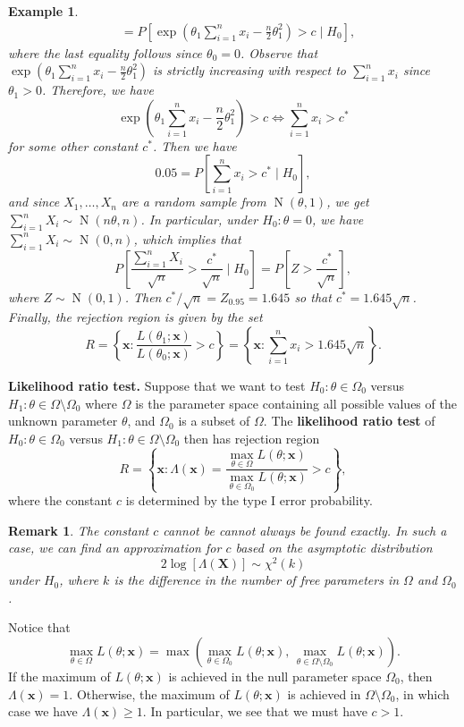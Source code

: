 \documentclass[10pt]{article}
\DeclareMathOperator{\Nor}{N}
\theoremstyle{newstyle}
\newtheorem{remark}[thm]{Remark}
\newtheorem{exmp}[thm]{Example}
\begin{document}
\begin{exmp}
{\begin{align*}
    &= P \left[ \exp \left(\theta_1 \sum_{i=1}^n x_i - \frac{n}2 \theta_1^2 \right) > c 
    \;\Bigg|\; H_0 \right],
\end{align*}
where the last equality follows since $\theta_0 = 0$. 
Observe that $\exp(\theta_1 \sum_{i=1}^n x_i - \frac{n}2 \theta_1^2)$ is strictly increasing 
with respect to $\sum_{i=1}^n x_i$ since $\theta_1 > 0$. Therefore, we have 
\[ \exp \left(\theta_1 \sum_{i=1}^n x_i - \frac{n}2 \theta_1^2 \right) > c \iff \sum_{i=1}^n x_i > c^* 
\] 
for some other constant $c^*$. Then we have 
\[ 0.05 = P \left[ \sum_{i=1}^n x_i > c^* \;\Bigg|\; H_0 \right], \]
and since $X_1, \dots, X_n$ are a random sample from $\Nor(\theta, 1)$, we get 
$\sum_{i=1}^n X_i \sim \Nor(n\theta, n)$. In particular, under $H_0 : \theta = 0$, 
we have $\sum_{i=1}^n X_i \sim \Nor(0, n)$, which implies that 
\[ P \left[ \frac{\sum_{i=1}^n X_i}{\sqrt n} > \frac{c^*}{\sqrt n} \;\Bigg|\; H_0 \right] 
= P \left[ Z > \frac{c^*}{\sqrt n} \right], \]
where $Z \sim \Nor(0, 1)$. Then $c^*/\sqrt n = Z_{0.95} = 1.645$ so that 
$c^* = 1.645 \sqrt n$. Finally, the rejection region is given by the set 
\[ R = \left\{ \mathbf x : \frac{L(\theta_1; \mathbf x)}{L(\theta_0; \mathbf x)} > c \right\}
= \left\{ \mathbf x : \sum_{i=1}^n x_i > 1.645 \sqrt n \right\}. \]}
\end{exmp}

{\bf Likelihood ratio test.} Suppose that we want to test 
$H_0 : \theta \in \Omega_0$ versus $H_1 : \theta \in \Omega \setminus \Omega_0$ where 
$\Omega$ is the parameter space containing all possible values of the unknown parameter $\theta$, 
and $\Omega_0$ is a subset of $\Omega$. The 
{\bf likelihood ratio test} of $H_0 : \theta \in \Omega_0$ versus $H_1 : \theta \in \Omega \setminus
\Omega_0$ then has rejection region 
\[ R = \left\{ \mathbf x : \Lambda(\mathbf x) = \frac{\max_{\theta \in \Omega} L(\theta; \mathbf x)}{\max_{\theta \in \Omega_0} L(\theta; \mathbf x)} > c \right\}, \]
where the constant $c$ is determined by the type I error probability. 

\begin{remark}
The constant $c$ cannot be cannot always be found exactly. In such a case, we can find an 
approximation for $c$ based on the asymptotic distribution 
\[ 2 \log [\Lambda(\mathbf X)] \sim \chi^2(k) \]
under $H_0$, where $k$ is the difference in the number of free parameters in $\Omega$ and $\Omega_0$. 
\end{remark}

Notice that 
\[ \max_{\theta \in \Omega} L(\theta; \mathbf x) = 
\max \left( \max_{\theta \in \Omega_0} L(\theta; \mathbf x),\, \max_{\theta \in \Omega \setminus 
\Omega_0} L(\theta; \mathbf x) \right). \]
If the maximum of $L(\theta; \mathbf x)$ is achieved in the null parameter space 
$\Omega_0$, then $\Lambda(\mathbf x) = 1$. Otherwise, the maximum of $L(\theta; \mathbf x)$ is 
achieved in $\Omega \setminus \Omega_0$, in which case we have $\Lambda(\mathbf x) \geq 1$. 
In particular, we see that we must have $c > 1$. 
\end{document}
